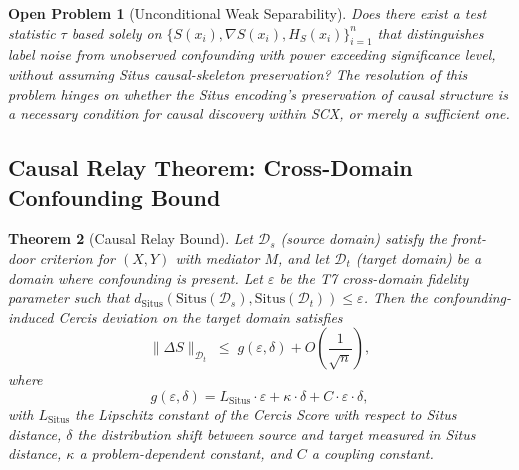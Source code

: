 \documentclass[12pt,a4paper]{article}
\newtheorem{theorem}{Theorem}[section]
\newtheorem{openproblem}[theorem]{Open Problem}
\newcommand{\cD}{\mathcal{D}}
\newcommand{\Situs}{\mathrm{Situs}}
\begin{document}
\begin{openproblem}[Unconditional Weak Separability]
\label{prob:unconditional}
Does there exist a test statistic $\tau$ based solely on
$\{S(x_i), \nabla S(x_i), H_S(x_i)\}_{i=1}^n$ that distinguishes label noise
from unobserved confounding with power exceeding significance level, without
assuming Situs causal-skeleton preservation?  The resolution of this problem
hinges on whether the Situs encoding's preservation of causal structure is a
necessary condition for causal discovery within SCX, or merely a sufficient
one.
\end{openproblem}

\subsection{Causal Relay Theorem: Cross-Domain Confounding Bound}
\label{sec:relay}

\begin{theorem}[Causal Relay Bound]
\label{thm:causal-relay}
Let $\cD_s$ (source domain) satisfy the front-door criterion for
$(X, Y)$ with mediator $M$, and let $\cD_t$ (target domain) be a domain where
confounding is present.  Let $\varepsilon$ be the T7 cross-domain fidelity
parameter such that
$d_{\Situs}(\Situs(\cD_s), \Situs(\cD_t)) \leq \varepsilon$.  Then the
confounding-induced Cercis deviation on the target domain satisfies
\begin{equation}\label{eq:relay-bound}
    \|\Delta S\|_{\cD_t} \;\leq\;
    g(\varepsilon, \delta) + O\!\left(\frac{1}{\sqrt{n}}\right),
\end{equation}
where
\begin{equation}\label{eq:g-function}
    g(\varepsilon, \delta) = L_{\Situs} \cdot \varepsilon
    + \kappa \cdot \delta + C \cdot \varepsilon \cdot \delta,
\end{equation}
with $L_{\Situs}$ the Lipschitz constant of the Cercis Score with respect to
Situs distance, $\delta$ the distribution shift between source and target
measured in Situs distance, $\kappa$ a problem-dependent constant, and
$C$ a coupling constant.
\end{theorem}
\end{document}
